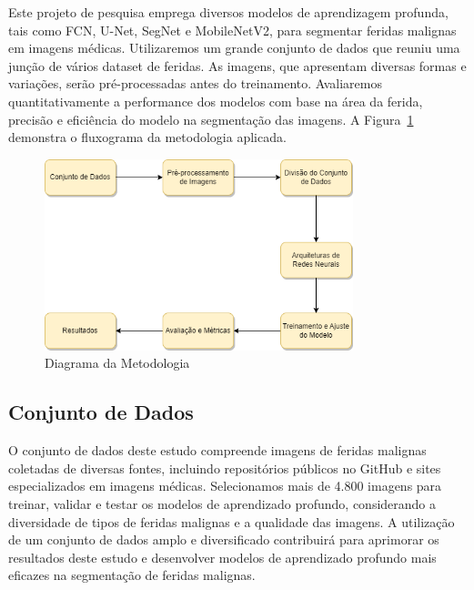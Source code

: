 

Este projeto de pesquisa emprega diversos modelos de aprendizagem profunda, tais como \ac{FCN}, \ac{U-Net}, \ac{SegNet} e \ac{MobileNetV2}, para segmentar feridas malignas em imagens médicas. Utilizaremos um grande conjunto de dados que reuniu uma junção de vários dataset de feridas. As imagens, que apresentam diversas formas e variações, serão pré-processadas antes do treinamento. Avaliaremos quantitativamente a performance dos modelos com base na área da ferida, precisão e eficiência do modelo na segmentação das imagens. A Figura~\ref{fig:diagrama} demonstra o fluxograma da metodologia aplicada.

\begin{figure}[H]
    \centering
    \includegraphics[width=0.8\textwidth]{img/Diagrama.png}
    \caption{Diagrama da Metodologia}
    \label{fig:diagrama}
\end{figure}

\subsection{Conjunto de Dados}
    O conjunto de dados deste estudo compreende imagens de feridas malignas coletadas de diversas fontes, incluindo repositórios públicos no GitHub e sites especializados em imagens médicas. Selecionamos mais de 4.800 imagens para treinar, validar e testar os modelos de aprendizado profundo, considerando a diversidade de tipos de feridas malignas e a qualidade das imagens. A utilização de um conjunto de dados amplo e diversificado contribuirá para aprimorar os resultados deste estudo e desenvolver modelos de aprendizado profundo mais eficazes na segmentação de feridas malignas.
    

